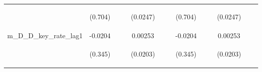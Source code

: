 \documentclass[]{article}
\begin{document}
\begin{center}
\begin{tabular}{lcccccccccccc}
\vspace{4pt} & \begin{footnotesize}(0.704)\end{footnotesize} & \begin{footnotesize}\end{footnotesize} & \begin{footnotesize}\end{footnotesize} & \begin{footnotesize}(0.0247)\end{footnotesize} & \begin{footnotesize}\end{footnotesize} & \begin{footnotesize}\end{footnotesize} & \begin{footnotesize}(0.704)\end{footnotesize} & \begin{footnotesize}\end{footnotesize} & \begin{footnotesize}\end{footnotesize} & \begin{footnotesize}(0.0247)\end{footnotesize} & \begin{footnotesize}\end{footnotesize} & \begin{footnotesize}\end{footnotesize} \\
m\_D\_D\_key\_rate\_lag1 & -0.0204 &  &  & 0.00253 &  &  & -0.0204 &  &  & 0.00253 &  &  \\
\vspace{4pt} & \begin{footnotesize}(0.345)\end{footnotesize} & \begin{footnotesize}\end{footnotesize} & \begin{footnotesize}\end{footnotesize} & \begin{footnotesize}(0.0203)\end{footnotesize} & \begin{footnotesize}\end{footnotesize} & \begin{footnotesize}\end{footnotesize} & \begin{footnotesize}(0.345)\end{footnotesize} & \begin{footnotesize}\end{footnotesize} & \begin{footnotesize}\end{footnotesize} & \begin{footnotesize}(0.0203)\end{footnotesize} & \begin{footnotesize}\end{footnotesize} & \begin{footnotesize}\end{footnotesize} \\

\end{tabular}
\end{center}
\end{document}
